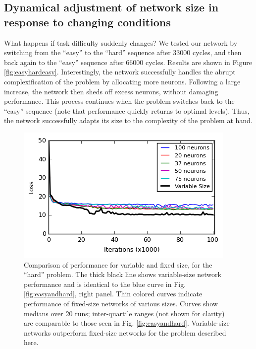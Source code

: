 \documentclass{article}
\begin{document}
\subsection{Dynamical adjustment of network size in response to changing conditions}

What happens if task difficulty suddenly changes? We tested our network by
 switching from the ``easy'' to the ``hard'' sequence after 33000
cycles, and then back again to the ``easy'' sequence after 66000 cycles.
Results are shown in Figure \ref{fig:easyhardeasy}. Interestingly, the network
successfully handles the abrupt complexification of the problem by allocating
more neurons. Following a large increase, the network then sheds off excess
neurons, without damaging performance. This process continues when the problem
switches back to the ``easy'' sequence (note that performance quickly returns
to optimal levels). Thus, the network successfully adapts its size to the complexity of the problem at hand.


\begin{figure}[t]
\label{fig:fixedsize}
  \centering
\includegraphics[scale=0.9]{figFS.png}
  \caption{Comparison of performance for variable and fixed size, for the
``hard'' problem. The thick black line shows variable-size network performance
and is identical to the blue curve in Fig. \ref{fig:easyandhard}, right panel.
Thin colored curves indicate performance of fixed-size networks of various
sizes. Curves show medians over 20
runs; inter-quartile ranges (not shown for clarity) are comparable to those
seen in Fig. \ref{fig:easyandhard}. Variable-size networks outperform fixed-size
networks for the problem described here. }
\end{figure}
\end{document}
